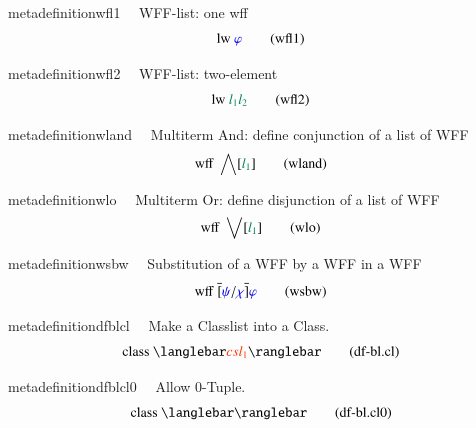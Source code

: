 \begin{restatable}{metadefinition}{wfl1}~~ WFF-list:  one wff
\begin{align}
\,\mathrm{lw}~ \mw{\varphi}\label{eq:wfl1}\tag{wfl1}
\end{align}
\end{restatable}

\begin{restatable}{metadefinition}{wfl2}~~ WFF-list: two-element
\begin{align}
\,\mathrm{lw}~ \mwl{l_1} \mwl{l_2}\label{eq:wfl2}\tag{wfl2}
\end{align}
\end{restatable}

\begin{restatable}{metadefinition}{wland}~~ Multiterm And:  define conjunction of a
list of WFF
\begin{align}
\,\mathrm{wff}~ \bigwedge[ \mwl{l_1} ]\label{eq:wland}\tag{wland}
\end{align}
\end{restatable}

\begin{restatable}{metadefinition}{wlo}~~ Multiterm Or:  define disjunction of a list
of WFF
\begin{align}
\,\mathrm{wff}~ \bigvee[ \mwl{l_1} ]\label{eq:wlo}\tag{wlo}
\end{align}
\end{restatable}

\begin{restatable}{metadefinition}{wsbw}~~ Substitution of a WFF by a WFF in a WFF
\begin{align}
\,\mathrm{wff}~ \overline{[} \mw{\psi} / \mw{\chi} \overline{]}
    \mw{\varphi}\label{eq:wsbw}\tag{wsbw}
\end{align}
\end{restatable}

\begin{restatable}{metadefinition}{dfblcl}~~ Make a Classlist into a Class.
\begin{align}
\,\mathrm{class}~ \langlebar \msc{csl_1}
    \ranglebar\label{eq:df-bl.cl}\tag{df-bl.cl}
\end{align}
\end{restatable}

\begin{restatable}{metadefinition}{dfblcl0}~~ Allow 0-Tuple.
\begin{align}
\,\mathrm{class}~ \langlebar \ranglebar\label{eq:df-bl.cl0}\tag{df-bl.cl0}
\end{align}
\end{restatable}

